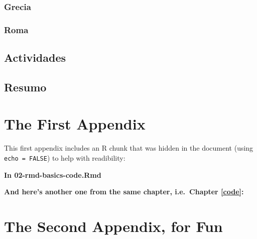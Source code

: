 \documentclass[a4paper, twoside]{templates/ociamthesis}
\newcommand*{\bibtitle}{Bibliografía}
\begin{document}
\hypertarget{grecia}{%
\subsection{Grecia}\label{grecia}}

\hypertarget{roma}{%
\subsection{Roma}\label{roma}}

\hypertarget{actividades}{%
\section{Actividades}\label{actividades}}

\hypertarget{resumo}{%
\section{Resumo}\label{resumo}}

\startappendices

\hypertarget{the-first-appendix}{%
\chapter{The First Appendix}\label{the-first-appendix}}

This first appendix includes an R chunk that was hidden in the document (using \texttt{echo\ =\ FALSE}) to help with readibility:

\textbf{In 02-rmd-basics-code.Rmd}

\textbf{And here's another one from the same chapter, i.e.~Chapter \ref{code}:}

\hypertarget{the-second-appendix-for-fun}{%
\chapter{The Second Appendix, for Fun}\label{the-second-appendix-for-fun}}


\setlength{\baselineskip}{0pt} %

{\renewcommand*\MakeUppercase[1]{#1}%
\printbibliography[heading=bibintoc,title={\bibtitle}]}
\end{document}
